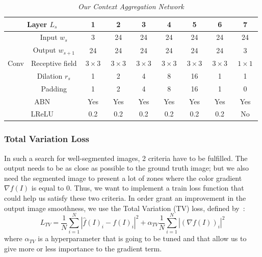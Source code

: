 \documentclass{article}
\begin{document}
            \begin{table}[!ht]
                \centering
                \begin{tabular}{|c|c||c|cccc|cc|}
                    \hline
                    \multicolumn{2}{|c||}{Layer $L_s$} & 1 & 2 & 3 & 4 & 5 & 6 & 7 \\
                    \hline
                    \hline
                     & Input $w_s$ & 3 & 24 & 24 & 24 & 24 & 24 & 24 \\
                     & Output $w_{s+1}$ & 24 & 24 & 24 & 24 & 24 & 24 & 3 \\
                    \cline{2-9}
                    Conv & Receptive field & $\ 3\times 3\ $ & $\ 3\times 3\ $ & $\ 3\times 3\ $ & $\ 3\times 3\ $ & $\ 3\times 3\ $ & $\ 3\times 3\ $ & $\ 1\times 1\ $ \\
                     & Dilation $r_s$ & 1 & 2 & 4 & 8 & 16 & 1 & 1 \\
                     & Padding & 1 & 2 & 4 & 8 & 16 & 1 & 0 \\
                    \hline
                    \multicolumn{2}{|c||}{ABN} & Yes & Yes & Yes & Yes & Yes & Yes & Yes \\
                    \hline
                    \multicolumn{2}{|c||}{LReLU} & 0.2 & 0.2 & 0.2 & 0.2 & 0.2 & 0.2 & No \\
                    \hline
                \end{tabular}
                \caption{\textit{Our Context Aggregation Network}}
            \end{table}


        \subsubsection{Total Variation Loss}
            In such a search for well-segmented images, 2 criteria have to be fulfilled. The output needs to be as close as possible to the ground truth image; but we also need the segmented image to present a lot of zones where the color gradient $\nabla f(I)$ is equal to $0$. Thus, we want to implement a train loss function that could help us satisfy these two criteria.
            In order grant an improvement in the output image smoothness, we use the Total Variation (TV) loss, defined by~\cite{tvloss}:
            $$
            L_{TV}=\frac{1}{N}\sum_{i=1}^N |\hat{f}(I)_i-f(I)_i|^2+\alpha_{TV}\frac{1}{N}\sum_{i=1}^N|(\nabla f(I))_i|^2
            $$
            where $\alpha_{TV}$ is a hyperparameter that is going to be tuned and that allow us to give more or less importance to the gradient term.
\end{document}

